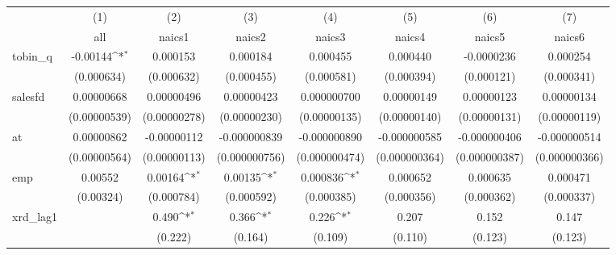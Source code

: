 {
\def\sym#1{\ifmmode^{#1}\else\(^{#1}\)\fi}
\begin{tabular}{l*{7}{c}}
\hline\hline
            &\multicolumn{1}{c}{(1)}&\multicolumn{1}{c}{(2)}&\multicolumn{1}{c}{(3)}&\multicolumn{1}{c}{(4)}&\multicolumn{1}{c}{(5)}&\multicolumn{1}{c}{(6)}&\multicolumn{1}{c}{(7)}\\
            &\multicolumn{1}{c}{all}&\multicolumn{1}{c}{naics1}&\multicolumn{1}{c}{naics2}&\multicolumn{1}{c}{naics3}&\multicolumn{1}{c}{naics4}&\multicolumn{1}{c}{naics5}&\multicolumn{1}{c}{naics6}\\
\hline
tobin\_q     &    -0.00144\sym{*}  &    0.000153         &    0.000184         &    0.000455         &    0.000440         &  -0.0000236         &    0.000254         \\
            &  (0.000634)         &  (0.000632)         &  (0.000455)         &  (0.000581)         &  (0.000394)         &  (0.000121)         &  (0.000341)         \\
[1em]
salesfd     &  0.00000668         &  0.00000496         &  0.00000423         & 0.000000700         &  0.00000149         &  0.00000123         &  0.00000134         \\
            &(0.00000539)         &(0.00000278)         &(0.00000230)         &(0.00000135)         &(0.00000140)         &(0.00000131)         &(0.00000119)         \\
[1em]
at          &  0.00000862         & -0.00000112         &-0.000000839         &-0.000000890         &-0.000000585         &-0.000000406         &-0.000000514         \\
            &(0.00000564)         &(0.00000113)         &(0.000000756)         &(0.000000474)         &(0.000000364)         &(0.000000387)         &(0.000000366)         \\
[1em]
emp         &     0.00552         &     0.00164\sym{*}  &     0.00135\sym{*}  &    0.000836\sym{*}  &    0.000652         &    0.000635         &    0.000471         \\
            &   (0.00324)         &  (0.000784)         &  (0.000592)         &  (0.000385)         &  (0.000356)         &  (0.000362)         &  (0.000337)         \\
[1em]
xrd\_lag1    &                     &       0.490\sym{*}  &       0.366\sym{*}  &       0.226\sym{*}  &       0.207         &       0.152         &       0.147         \\
            &                     &     (0.222)         &     (0.164)         &     (0.109)         &     (0.110)         &     (0.123)         &     (0.123)         \\

\end{tabular}}

